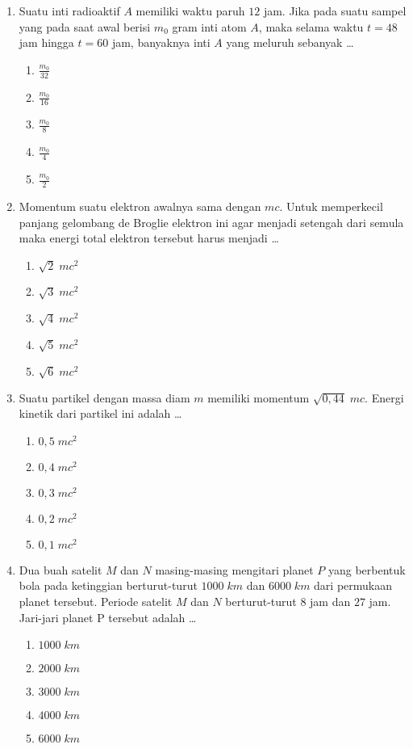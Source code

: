 \documentclass[A4,12PT, english, twocolumn]{journal}
\begin{document}
\begin{enumerate}
\item Suatu inti radioaktif $A$ memiliki waktu paruh $12$ jam. Jika pada suatu sampel yang pada saat awal berisi $m_0$ gram inti atom $A$, maka selama waktu $t=48$ jam hingga $t=60$ jam, banyaknya inti $A$ yang meluruh sebanyak \dots
    \begin{enumerate}
        \item $\frac{m_0}{32}$
        \item $\frac{m_0}{16}$
        \item $\frac{m_0}{8}$
        \item $\frac{m_0}{4}$
        \item $\frac{m_0}{2}$
    \end{enumerate}

\item Momentum suatu elektron awalnya sama dengan $mc$. Untuk memperkecil panjang gelombang de Broglie elektron ini agar menjadi setengah dari semula maka energi total elektron tersebut harus menjadi \dots
    \begin{enumerate}
        \item $\sqrt{2} \; mc^2$
        \item $\sqrt{3} \; mc^2$
        \item $\sqrt{4} \; mc^2$
        \item $\sqrt{5} \; mc^2$
        \item $\sqrt{6} \; mc^2$
    \end{enumerate}

\item Suatu partikel dengan massa diam $m$ memiliki momentum $\sqrt{0,44} \; mc$. Energi kinetik dari partikel ini adalah \dots
    \begin{enumerate}
        \item $0,5 \; mc^2$
        \item $0,4 \; mc^2$
        \item $0,3 \; mc^2$
        \item $0,2 \; mc^2$
        \item $0,1 \; mc^2$
    \end{enumerate}

\item Dua buah satelit $M$ dan $N$ masing-masing mengitari planet $P$ yang berbentuk bola pada ketinggian berturut-turut $1000 \; km$ dan $6000 \; km$ dari permukaan planet tersebut. Periode satelit $M$ dan $N$ berturut-turut $8$ jam dan $27$ jam. Jari-jari planet P tersebut adalah \dots
    \begin{enumerate}
        \item $1000 \; km$
        \item $2000 \; km$
        \item $3000 \; km$
        \item $4000 \; km$
        \item $6000 \; km$
    \end{enumerate}

\end{enumerate}
\end{document}
